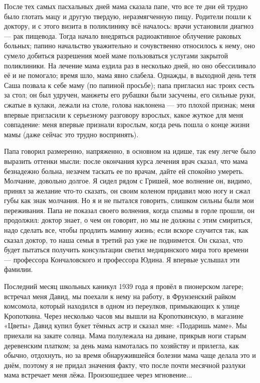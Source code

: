 После тех самых пасхальных дней мама сказала папе, что все те дни ей трудно было глотать мацу и другую твердую, неразмягченную пищу. Родители пошли к доктору, и с этого визита в поликлинику всё началось: врачи установили диагноз — рак пищевода. Тогда начало внедряться радиоактивное облучение раковых больных; папино начальство уважительно и сочувственно относилось к нему, оно сумело добиться разрешения моей маме пользоваться услугами закрытой поликлиники. На лечение мама ездила раз в несколько дней, но оно обессиливало её и не помогало; время шло, мама явно слабела. Однажды, в выходной день тетя Саша позвала к себе маму (по папиной просьбе); папа пригласил нас троих сесть за стол; он был удручен, манжеты его рубашки были засучены, его сильные руки, сжатые в кулаки, лежали на столе, голова наклонена — это плохой признак; меня впервые пригласили к серьезному разговору взрослых, какое жуткое для меня совпадение: меня впервые признали взрослым, когда речь пошла о конце жизни мамы (даже сейчас это трудно воспринять).

Папа говорил размеренно, напряженно, в основном на идише, так ему легче было выразить оттенки мысли: после окончания курса лечения врач сказал, что мама безнадежно больна, незачем таскать ее по врачам, дайте ей спокойно умереть. Молчание, довольно долгое. Я сидел рядом с Гришей, мое волнение он, видимо, принял за желание что-то сказать, он своим коленом придавил мою ногу и сжал губы как знак молчания. Но я и не пытался говорить, слишком сильны были мои переживания. Папа не показал своего волнения, когда спазмы в горле прошли, он продолжил: доктор знает, о чем он говорит, но мы не должны с этим смириться, надо сделать все, чтобы продлить мамину жизнь; если вскоре случится так, как сказал доктор, то наша семья в третий раз уже не поднимется. Он сказал, что будет пытаться получить консультации светил медицинского мира того времени — профессора Кончаловского и профессора Юдина. Я впервые услышал эти фамилии.

Последний месяц школьных каникул 1939 года я провёл в пионерском лагере; встречал меня Давид, мы поехали к нему на работу, в Фрунзенский райком комсомола, который находился в одном из переулков, примыкающих к улице Кропоткина. Через несколько часов мы вышли на Кропоткинскую, в магазине «Цветы» Давид купил букет тёмных астр и сказал мне: «Подаришь маме». Мы приехали на закате солнца. Мама полулежала на диване, прикрыв ноги старым деревенским платком; за день мама намоталась по хозяйству и прилегла, как обычно, отдохнуть, но за время обнаружившейся болезни мама чаще делала это и днём, поэтому я не придал значения факту, что после почти месячной разлуки мама встречает меня лёжа. Произошедшее через мгновение...

